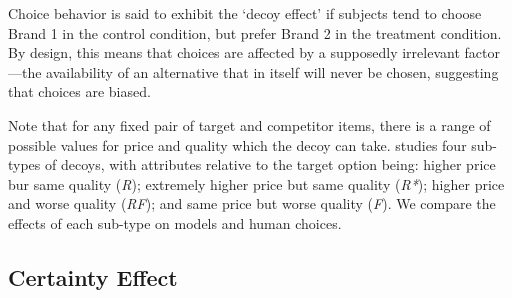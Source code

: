 Choice behavior is said to exhibit the `decoy effect' if 
subjects tend to choose Brand 1 in the control condition,
but prefer Brand 2 in the treatment condition.
By design, this means that choices are affected by a supposedly irrelevant factor---the availability of an alternative that in itself will never be chosen,
suggesting that choices are biased.

Note that for any fixed pair of target and competitor items,
there is a range of possible values for price and quality which the decoy can take.
\citet{huber1982adding} studies four sub-types of decoys, with attributes relative
to the target option being:
higher price bur same quality (\textit{R});
extremely higher price but same quality (\textit{R*});
higher price and worse quality (\textit{RF});
and same price but worse quality (\textit{F}).
We compare the effects of each sub-type on models and human choices.


\subsection{Certainty Effect} \label{subsec:def_certainty}

